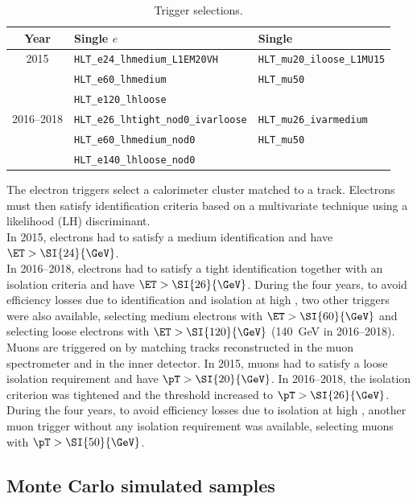 \begin{table}[htbp]
	\centering
	\footnotesize
	\begin{tabular}{cll}
		\toprule
		Year & \multicolumn{1}{l}{Single $e$} & \multicolumn{1}{l}{Single \Pgm} \\
		\midrule
		2015 & \texttt{HLT\_e24\_lhmedium\_L1EM20VH} & \texttt{HLT\_mu20\_iloose\_L1MU15} \\
		& \texttt{HLT\_e60\_lhmedium} & \texttt{HLT\_mu50} \\
		& \texttt{HLT\_e120\_lhloose} & \\
		\midrule
		2016--2018 & \texttt{HLT\_e26\_lhtight\_nod0\_ivarloose} & \texttt{HLT\_mu26\_ivarmedium} \\
		& \texttt{HLT\_e60\_lhmedium\_nod0} & \texttt{HLT\_mu50} \\
		& \texttt{HLT\_e140\_lhloose\_nod0} & \\
		\bottomrule
	\end{tabular}
	\caption{Trigger selections.}%
	\label{tab:samples:trig}
\end{table}

\noindent The electron triggers select a calorimeter cluster matched to a track.
Electrons must then satisfy identification criteria based on a multivariate technique using a likelihood (LH) discriminant.\\
In 2015, electrons had to satisfy a medium identification and have $\ET > \SI{24}{\GeV}$.\\
In 2016--2018, electrons had to satisfy a tight identification
together with an isolation criteria and have $\ET > \SI{26}{\GeV}$.
During the four years, to avoid efficiency losses due to identification and isolation at high \pT, 
two other triggers were also available,
selecting medium electrons with $\ET > \SI{60}{\GeV}$
and selecting loose electrons with $\ET > \SI{120}{\GeV}$ (\SI{140}{\GeV} in 2016--2018).\\
Muons are triggered on by matching tracks reconstructed in the muon spectrometer and in the inner detector.
In 2015, muons had to satisfy a loose isolation requirement and have $\pT >\SI{20}{\GeV}$. In 2016--2018, the isolation criterion was tightened and the threshold increased to $\pT >\SI{26}{\GeV}$.
During the four years, to avoid efficiency losses due to isolation at high \pT,
another muon trigger without any isolation requirement was available,
selecting muons with $\pT > \SI{50}{\GeV}$. 

\subsection{Monte Carlo simulated samples}%
\label{sec:samples:mc}

